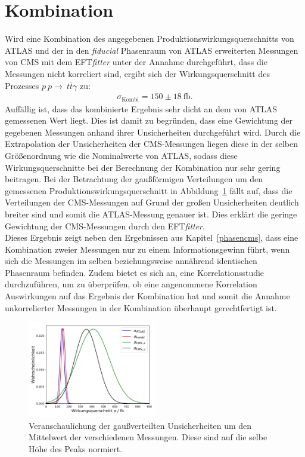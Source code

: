\section{Kombination}
\label{kombi}
Wird eine Kombination des angegebenen Produktionswirkungsquerschnitts von ATLAS und der in den \textit{fiducial} Phasenraum von ATLAS erweiterten Messungen von CMS mit dem EFT\textit{fitter} unter der Annahme durchgeführt, dass die Messungen nicht korreliert sind, ergibt sich der Wirkungsquerschnitt des Prozesses $p~p \rightarrow~t\bar{t}\gamma$ zu:
\begin{align}
  \sigma_{\text{Kombi}} = 150 \pm 18~ \si{\femto\barn}.
\end{align}
Auffällig ist, dass das kombinierte Ergebnis sehr dicht an dem von ATLAS gemessenen Wert liegt.
Dies ist damit zu begründen, dass eine Gewichtung der gegebenen Messungen anhand ihrer Unsicherheiten durchgeführt wird.
Durch die Extrapolation der Unsicherheiten der CMS-Messungen liegen diese in der selben Größenordnung wie die Nominalwerte von ATLAS, sodass diese Wirkungsquerschnitte bei der Berechnung der Kombination nur sehr gering beitragen.
Bei der Betrachtung der gaußförmigen Verteilungen um den gemessenen Produktionswirkungsquerschnitt in Abbildung~\ref{fig:gau} fällt auf, dass die Verteilungen der CMS-Messungen auf Grund der großen Unsicherheiten deutlich breiter sind und somit die ATLAS-Messung genauer ist.
Dies erklärt die geringe Gewichtung der CMS-Messungen durch den EFT\textit{fitter}.\\
Dieses Ergebnis zeigt neben den Ergebnissen aus Kapitel~\ref{phasencms}, dass eine Kombination zweier Messungen nur zu einem Informationsgewinn führt, wenn sich die Messungen im selben beziehungsweise annährend identischen Phasenraum befinden. Zudem bietet es sich an, eine Korrelationsstudie durchzuführen, um zu überprüfen, ob eine angenommene Korrelation Auswirkungen auf das Ergebnis der Kombination hat und somit die Annahme unkorrelierter Messungen in der Kombination überhaupt gerechtfertigt ist.

\begin{figure}
  \centering
  \includegraphics[width=0.5\textwidth]{Plots/gauss.pdf}
  \caption{Veranschaulichung der gaußverteilten Unsicherheiten um den Mittelwert der verschiedenen Messungen. Diese sind auf die selbe Höhe des Peaks normiert.}
  \label{fig:gau}
\end{figure}

